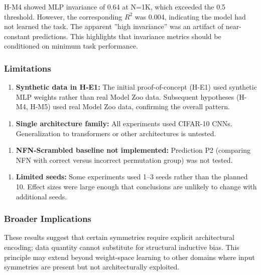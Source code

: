 H-M4 showed MLP invariance of 0.64 at N=1K, which exceeded the 0.5 threshold. However, the corresponding $R^2$ was 0.004, indicating the model had not learned the task. The apparent ''high invariance'' was an artifact of near-constant predictions. This highlights that invariance metrics should be conditioned on minimum task performance.

\subsubsection{Limitations}

\begin{enumerate}
\item \textbf{Synthetic data in H-E1:} The initial proof-of-concept (H-E1) used synthetic MLP weights rather than real Model Zoo data. Subsequent hypotheses (H-M4, H-M5) used real Model Zoo data, confirming the overall pattern.
\end{enumerate}

\begin{enumerate}
\item \textbf{Single architecture family:} All experiments used CIFAR-10 CNNs. Generalization to transformers or other architectures is untested.
\end{enumerate}

\begin{enumerate}
\item \textbf{NFN-Scrambled baseline not implemented:} Prediction P2 (comparing NFN with correct versus incorrect permutation group) was not tested.
\end{enumerate}

\begin{enumerate}
\item \textbf{Limited seeds:} Some experiments used 1--3 seeds rather than the planned 10. Effect sizes were large enough that conclusions are unlikely to change with additional seeds.
\end{enumerate}

\subsubsection{Broader Implications}

These results suggest that certain symmetries require explicit architectural encoding; data quantity cannot substitute for structural inductive bias. This principle may extend beyond weight-space learning to other domains where input symmetries are present but not architecturally exploited.

